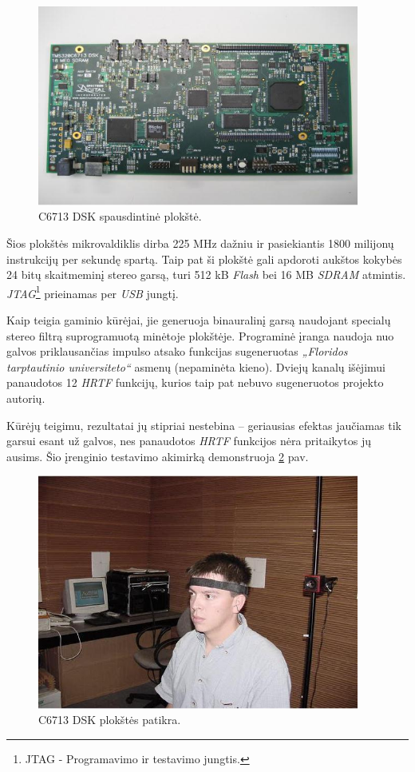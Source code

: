 \documentclass[]{vgtuef}
\begin{document}
\begin{figure}[!h]
  \centering
  \includegraphics[width=400px]{img/c6713.jpg}
  \caption{C6713 DSK spausdintinė plokštė.}
  \label{fig:C6713_dsk_board}
\end{figure}

Šios plokštės mikrovaldiklis dirba 225 MHz dažniu ir pasiekiantis 1800 milijonų instrukcijų per sekundę spartą. Taip pat ši plokštė gali apdoroti aukštos kokybės 24 bitų skaitmeminį stereo garsą, turi 512 kB \textit{Flash} bei 16 MB \textit{SDRAM} atmintis. \textit{JTAG}\footnote{JTAG - Programavimo ir testavimo jungtis.} prieinamas per \textit{USB} jungtį.

Kaip teigia gaminio kūrėjai, jie generuoja binauralinį garsą naudojant specialų stereo filtrą suprogramuotą minėtoje plokštėje. Programinė įranga naudoja nuo galvos priklausančias impulso atsako funkcijas sugeneruotas \textit{„Floridos tarptautinio universiteto“} asmenų (nepaminėta kieno). Dviejų kanalų išėjimui panaudotos 12 \textit{HRTF} funkcijų, kurios taip pat nebuvo sugeneruotos projekto autorių. 

Kūrėjų teigimu, rezultatai jų stipriai nestebina – geriausias efektas jaučiamas tik garsui esant už galvos, nes panaudotos \textit{HRTF} funkcijos nėra pritaikytos jų ausims. Šio įrenginio testavimo akimirką demonstruoja \ref{fig:C6713_dsk_board_checkout} pav.

\begin{figure}[!h]
  \centering
  \includegraphics[width=400px]{img/c6713_patikra.jpg}
  \caption{C6713 DSK plokštės patikra.}
  \label{fig:C6713_dsk_board_checkout}
\end{figure}
\end{document}
